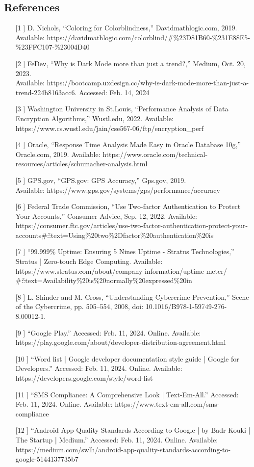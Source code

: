 \documentclass[]{article}
\begin{document}
\subsection{References}
\label{sub:references}
\begin{itemize}
	\item[[1]] D. Nichols, “Coloring for Colorblindness,” Davidmathlogic.com, 2019.
	\\Available: https://davidmathlogic.com/colorblind/\#\%23D81B60-\%231E88E5-\%23FFC107-\%23004D40
	\item[[2]] FeDev, “Why is Dark Mode more than just a trend?,” Medium, Oct. 20, 2023.
	\\Available: https://bootcamp.uxdesign.cc/why-is-dark-mode-more-than-just-a-trend-224b8163acc6. Accessed: Feb. 14, 2024
	\item[[3]] Washington University in St.Louis, “Performance Analysis of Data Encryption Algorithms,” Wustl.edu, 2022.
	Available: https://www.cs.wustl.edu/\~jain/cse567-06/ftp/encryption\_perf
	\item[[4]] Oracle, “Response Time Analysis Made Easy in Oracle Database 10g,” Oracle.com, 2019.
	Available: https://www.oracle.com/technical-resources/articles/schumacher-analysis.html
	\item[[5]] GPS.gov, “GPS.gov: GPS Accuracy,” Gps.gov, 2019.
	\\Available: https://www.gps.gov/systems/gps/performance/accuracy
	\item[[6]] Federal Trade Commission, “Use Two-factor Authentication to Protect Your Accounts,” Consumer Advice, Sep. 12, 2022.
	Available: https://consumer.ftc.gov/articles/use-two-factor-authentication-protect-your-accounts\#:\~:text=Using\%20two\%2Dfactor\%20authentication\%20is
	\item[[7]] “99.999\% Uptime: Ensuring 5 Nines Uptime - Stratus Technologies,” Stratus | Zero-touch Edge Computing. Available: https://www.stratus.com/about/company-information/uptime-meter/
	\\\#:\~:text=Availability\%20is\%20normally\%20expressed\%20in
	\item[[8]] L. Shinder and M. Cross, “Understanding Cybercrime Prevention,” Scene of the Cybercrime, pp. 505–554, 2008, doi: 10.1016/B978-1-59749-276-8.00012-1.
	\item[[9]] “Google Play.” Accessed: Feb. 11, 2024. Online.
	Available: https://play.google.com/about/developer-distribution-agreement.html
	\item[[10]] “Word list  |  Google developer documentation style guide  |  Google for Developers.” Accessed: Feb. 11, 2024. Online. Available: https://developers.google.com/style/word-list
	\item[[11]] “SMS Compliance: A Comprehensive Look | Text-Em-All.” Accessed: Feb. 11, 2024. Online. Available: https://www.text-em-all.com/sms-compliance
	\item[[12]] “Android App Quality Standards According to Google | by Badr Kouki | The Startup | Medium.” Accessed: Feb. 11, 2024. Online. Available: https://medium.com/swlh/android-app-quality-standards-according-to-google-5144137735b7

\end{itemize}
\end{document}
